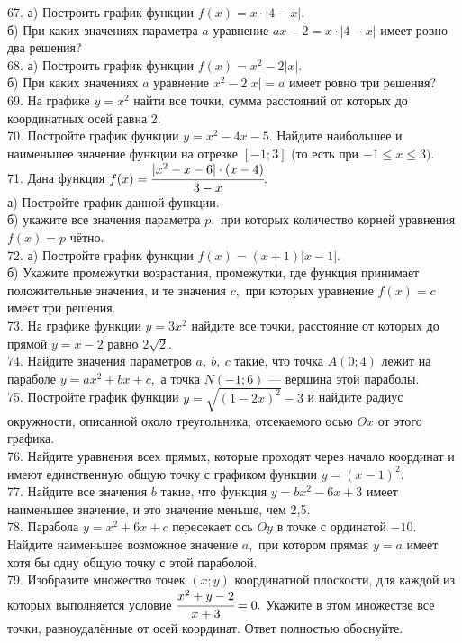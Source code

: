 67. а) Построить график функции $f(x)=x\cdot|4-x|.$\\
б) При каких значениях параметра $a$ уравнение $ax-2=x\cdot|4-x|$ имеет ровно два решения?\\
68. а) Построить график функции $f(x)=x^2-2|x|.$\\
б) При каких значениях $a$ уравнение $x^2-2|x|=a$ имеет ровно три решения?\\
69. На графике $y=x^2$ найти все точки, сумма расстояний от которых до координатных осей равна 2.\\
70. Постройте график функции $y=x^2-4x-5.$ Найдите наибольшее и наименьшее значение функции на отрезке $[-1;3]$ (то есть при $-1\leqslant x \leqslant 3).$\\
71. Дана функция $f(x)=\cfrac{|x^2-x-6|\cdot(x-4)}{3-x}.$\\
а) Постройте график данной функции.\\
б) укажите все значения параметра $p,$ при которых количество корней уравнения $f(x)=p$ чётно.\\
72. а) Постройте график функции $f(x)=(x+1)|x-1|.$\\
б) Укажите промежутки возрастания, промежутки, где функция принимает положительные значения, и те значения $c,$ при которых уравнение $f(x)=c$ имеет три решения.\\
73. На графике функции $y=3x^2$ найдите все точки, расстояние от которых до прямой $y=x-2$ равно $2\sqrt{2}.$\\
74. Найдите значения параметров $a,\ b,\ c$ такие, что точка $A(0;4)$ лежит на параболе $y=ax^2+bx+c,$ а точка $N(-1;6)$ --- вершина этой параболы.\\
75. Постройте график функции $y=\sqrt{(1-2x)^2}-3$ и найдите радиус окружности, описанной около треугольника, отсекаемого осью $Ox$ от этого графика.\\
76. Найдите уравнения всех прямых, которые проходят через начало координат и имеют единственную общую точку с графиком функции $y=(x-1)^2.$\\
77. Найдите все значения $b$ такие, что функция $y=bx^2-6x+3$ имеет наименьшее значение, и это значение меньше, чем 2,5.\\
78. Парабола $y=x^2+6x+c$ пересекает ось $Oy$ в точке с ординатой $-10.$ Найдите наименьшее возможное значение $a,$ при котором прямая $y=a$ имеет хотя бы одну общую точку с этой параболой.\\
79. Изобразите множество точек $(x;y)$ координатной плоскости, для каждой из которых выполняется условие $\cfrac{x^2+y-2}{x+3}=0.$ Укажите в этом множестве все точки, равноудалённые от осей координат. Ответ полностью обоснуйте.\\
